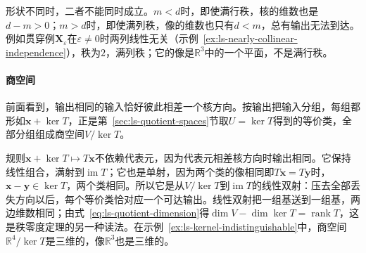 形状不同时，二者不能同时成立。$m<d$时，即使满行秩，核的维数也是$d-m>0$；$m>d$时，即使满列秩，像的维数也只有$d<m$，总有输出无法到达。例如贯穿例$\bm X_\varepsilon$在$\varepsilon\neq0$时两列线性无关（示例~\ref{ex:ls-nearly-collinear-independence}），秩为$2$，满列秩；它的像是$\mathbb R^3$中的一个平面，不是满行秩。

\paragraph{商空间}
前面看到，输出相同的输入恰好彼此相差一个核方向。按输出把输入分组，每组都形如$\bm x+\ker T$，正是第~\ref{sec:ls-quotient-spaces}节取$U=\ker T$得到的等价类，全部分组组成商空间$V/\ker T$。

规则$\bm x+\ker T\mapsto T\bm x$不依赖代表元，因为代表元相差核方向时输出相同。它保持线性组合，满射到$\operatorname{im}T$；它也是单射，因为两个类的像相同即$T\bm x=T\bm y$时，$\bm x-\bm y\in\ker T$，两个类相同。所以它是从$V/\ker T$到$\operatorname{im}T$的线性双射：压去全部丢失方向以后，每个等价类恰对应一个可达输出。线性双射把一组基送到一组基，两边维数相同；由式~\eqref{eq:ls-quotient-dimension}得$\dim V-\dim\ker T=\operatorname{rank}T$，这是秩零度定理的另一种读法。在示例~\ref{ex:ls-kernel-indistinguishable}中，商空间$\mathbb R^4/\ker T$是三维的，像$\mathbb R^3$也是三维的。

